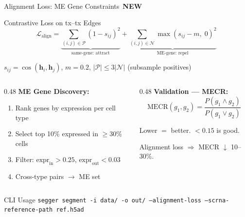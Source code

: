 \documentclass[aspectratio=169,10pt]{beamer}
\newcommand{\vect}[1]{\boldsymbol{#1}}
\newcommand{\Lcal}{\mathcal{L}}
\newcommand{\NEW}{\,{\scriptsize\colorbox{newgreen}{\color{white}\textbf{NEW}}}\,}
\begin{document}
\begin{frame}{Alignment Loss: ME Gene Constraints \NEW}

\begin{block}{Contrastive Loss on tx--tx Edges}
\vspace{-0.2cm}
\[
  \Lcal_{\text{align}} = \underbrace{\sum_{(i,j) \in \mathcal{P}} (1 - s_{ij})^2}_{\text{same-gene: attract}} + \underbrace{\sum_{(i,j) \in \mathcal{N}} \max(s_{ij} - m,\; 0)^2}_{\text{ME-gene: repel}}
\]
\end{block}

{\small
$s_{ij} = \cos(\vect{h}_i, \vect{h}_j)$, \quad $m = 0.2$, \quad $|\mathcal{P}| \leq 3|\mathcal{N}|$ (subsample positives)
}

\vspace{0.15cm}

\begin{columns}[T]
\begin{column}{0.48\textwidth}
\textbf{ME Gene Discovery:}
{\small
\begin{enumerate}\setlength\itemsep{1pt}
  \item Rank genes by expression per cell type
  \item Select top 10\% expressed in $\geq$30\% cells
  \item Filter: $\text{expr}_{\text{in}} > 0.25$, $\text{expr}_{\text{out}} < 0.03$
  \item Cross-type pairs $\to$ ME set
\end{enumerate}
}
\end{column}
\begin{column}{0.48\textwidth}
\textbf{Validation --- MECR:}
\[
  \text{MECR}(g_1, g_2) = \frac{P(g_1 \wedge g_2)}{P(g_1 \vee g_2)}
\]
{\small Lower $=$ better. $< 0.15$ is good.

Alignment loss $\Rightarrow$ MECR $\downarrow$ 10--30\%.}
\end{column}
\end{columns}

\vspace{0.15cm}
\begin{exampleblock}{CLI Usage}
\centering
{\small\texttt{segger segment -i data/ -o out/ --alignment-loss --scrna-reference-path ref.h5ad}}
\end{exampleblock}
\end{frame}
\end{document}
